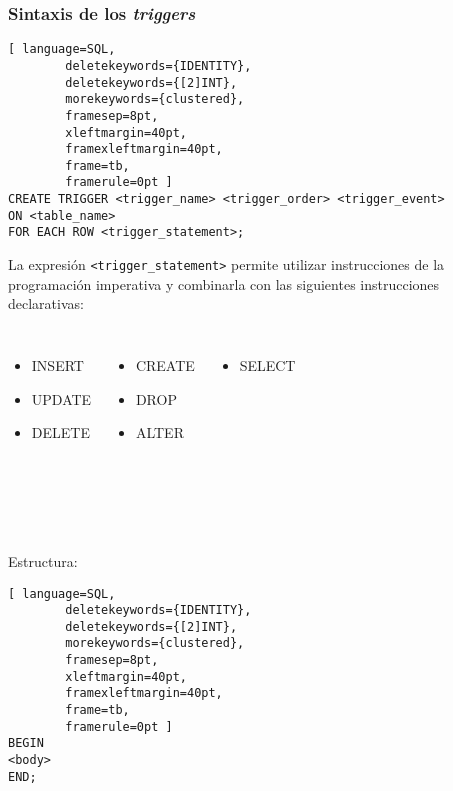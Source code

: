 \begin{frame}[fragile]
	
	\frametitle{Sintaxis de los \emph{triggers}}
	
	\begin{lstlisting}[ language=SQL,
		deletekeywords={IDENTITY},
		deletekeywords={[2]INT},
		morekeywords={clustered},
		framesep=8pt,
		xleftmargin=40pt,
		framexleftmargin=40pt,
		frame=tb,
		framerule=0pt ]
CREATE TRIGGER <trigger_name> <trigger_order> <trigger_event> 
ON <table_name> 
FOR EACH ROW <trigger_statement>;
\end{lstlisting}

	\pause
	
	La expresión \texttt{<trigger\_statement>} permite utilizar instrucciones de la programación imperativa y combinarla con las siguientes instrucciones declarativas: 
	\begin{columns}[t]
		
		\begin{itemize}
			\item \textcolor{codepurple}{INSERT}
			\item \textcolor{codepurple}{UPDATE}
			\item \textcolor{codepurple}{DELETE}
		\end{itemize}
		
		
		\begin{itemize}
			\item \textcolor{codepurple}{CREATE}
			\item \textcolor{codepurple}{DROP}
			\item \textcolor{codepurple}{ALTER}
		\end{itemize}
		
		
		\begin{itemize}
			\item \textcolor{codepurple}{SELECT}
		\end{itemize}
		
	\end{columns}
	
	\ 
	
	\ 
	
	\pause
	
	Estructura: 
		\begin{lstlisting}[ language=SQL,
		deletekeywords={IDENTITY},
		deletekeywords={[2]INT},
		morekeywords={clustered},
		framesep=8pt,
		xleftmargin=40pt,
		framexleftmargin=40pt,
		frame=tb,
		framerule=0pt ]
BEGIN
<body>
END;
\end{lstlisting}
	
\end{frame}

